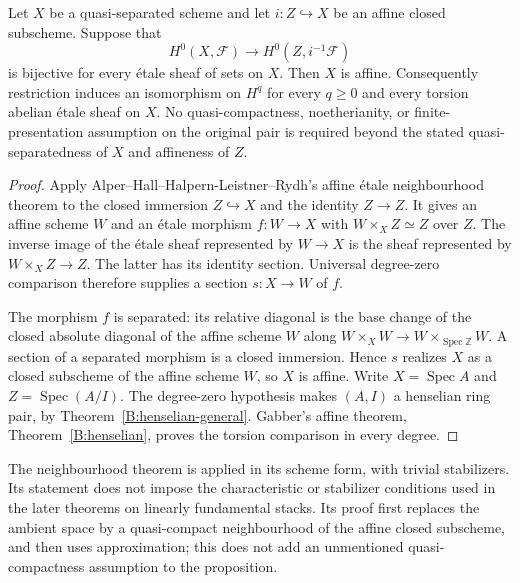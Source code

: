 \begin{proposition}\label{C:henselian-affine-closed-fibre}
Let $X$ be a quasi-separated scheme and let $i:Z\hookrightarrow X$
be an affine closed subscheme. Suppose that
\[
 H^0(X,\mathcal F)\longrightarrow H^0(Z,i^{-1}\mathcal F)
\]
is bijective for every \'etale sheaf of sets on $X$. Then $X$ is
affine. Consequently restriction induces an isomorphism on $H^q$
for every $q\ge0$ and every torsion abelian \'etale sheaf on $X$.
No quasi-compactness, noetherianity, or finite-presentation assumption
on the original pair is required beyond the stated quasi-separatedness
of $X$ and affineness of $Z$.
\end{proposition}
\begin{proof}
Apply Alper--Hall--Halpern-Leistner--Rydh's affine \'etale
neighbourhood theorem \cite[Theorem~1.2 and its proof in Section~3]{C_AHHR2024}
to the closed immersion $Z\hookrightarrow X$ and the identity
$Z\to Z$. It gives an affine scheme $W$ and an \'etale morphism
$f:W\to X$ with $W\times_X Z\simeq Z$ over $Z$.
The inverse image of the \'etale sheaf represented by $W\to X$ is
the sheaf represented by $W\times_X Z\to Z$. The latter has its
identity section. Universal degree-zero comparison therefore supplies
a section $s:X\to W$ of $f$.

The morphism $f$ is separated: its relative diagonal is the base
change of the closed absolute diagonal of the affine scheme $W$
along $W\times_XW\to W\times_{\operatorname{Spec}\mathbb Z}W$.
A section of a separated morphism is a closed immersion. Hence
$s$ realizes $X$ as a closed subscheme of the affine scheme $W$,
so $X$ is affine. Write $X=\operatorname{Spec}A$ and
$Z=\operatorname{Spec}(A/I)$. The degree-zero hypothesis makes
$(A,I)$ a henselian ring pair, by Theorem~\ref{B:henselian-general}.
Gabber's affine theorem, Theorem~\ref{B:henselian}, proves the
torsion comparison in every degree.
\end{proof}

The neighbourhood theorem is applied in its scheme form, with
trivial stabilizers. Its statement does not impose the characteristic
or stabilizer conditions used in the later theorems on linearly
fundamental stacks. Its proof first replaces the ambient space by a
quasi-compact neighbourhood of the affine closed subscheme, and
then uses approximation; this does not add an unmentioned
quasi-compactness assumption to the proposition.

